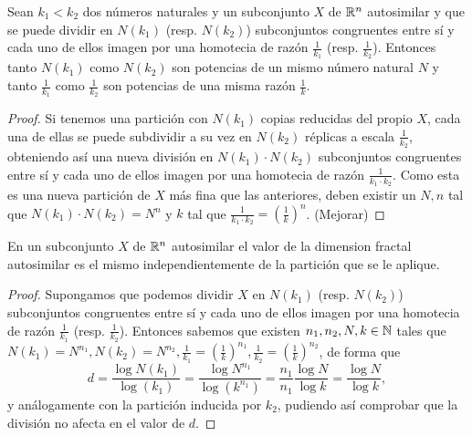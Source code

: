 \begin{lema}
Sean $k_1 < k_2$ dos números naturales y un subconjunto $X$ de $\mathbb{R}^n$ autosimilar y que se puede dividir en $N(k_1)$ (resp. $N(k_2)$) subconjuntos congruentes entre sí y cada uno de ellos imagen por una homotecia de razón $\frac {1}{k_1}$ (resp. $\frac {1}{k_2}$). Entonces tanto $N(k_1)$ como $N(k_2)$ son potencias de un mismo número natural $N$ y tanto $\frac{1}{k_1}$ como $\frac{1}{k_2}$ son potencias de una misma razón $\frac 1 k$.
\end{lema}
\begin{proof}
Si tenemos una partición con $N(k_1)$ copias reducidas del propio $X$, cada una de ellas se puede subdividir a su vez en $N(k_2)$ réplicas a escala $\frac 1{k_2}$, obteniendo así una nueva división en $N(k_1)\cdot N(k_2)$ subconjuntos congruentes entre sí y cada uno de ellos imagen por una homotecia de razón $\frac{1}{k_1\cdot k_2}$. Como esta es una nueva partición de $X$ más fina que las anteriores, deben existir un $N,n$ tal que $N(k_1)\cdot N(k_2)=N^n$ y $k$ tal que $\frac{1}{k_1\cdot k_2}=\left(\frac{1}{k}\right)^n$. (Mejorar)
\end{proof}

\begin{proposicion}
En un subconjunto $X$ de $\mathbb{R}^n$ autosimilar el valor de la dimension fractal autosimilar es el mismo independientemente de la partición que se le aplique.
\end{proposicion}
\begin{proof}
Supongamos que podemos dividir $X$ en $N(k_1)$ (resp. $N(k_2)$) subconjuntos congruentes entre sí y cada uno de ellos imagen por una homotecia de razón $\frac {1}{k_1}$ (resp. $\frac {1}{k_2}$). Entonces sabemos que existen $n_1, n_2, N, k\in \mathbb{N}$ tales que $N(k_1)=N^{n_1}, N(k_2)=N^{n_2}, \frac 1 {k_1} = \left(\frac{1}{k}\right)^{n_1}, \frac{1}{k_2} = \left(\frac{1}{k}\right)^{n_2} $, de forma que 
$$
d = \frac{\log N(k_1)}{\log(k_1)} = \frac{\log N^{n_1}}{\log(k^{n_1})} = \frac{n_1}{n_1} \frac{\log N}{\log k} = \frac{\log N}{\log k},
$$
y análogamente con la partición inducida por $k_2$, pudiendo así comprobar que la división no afecta en el valor de $d$.
\end{proof}

